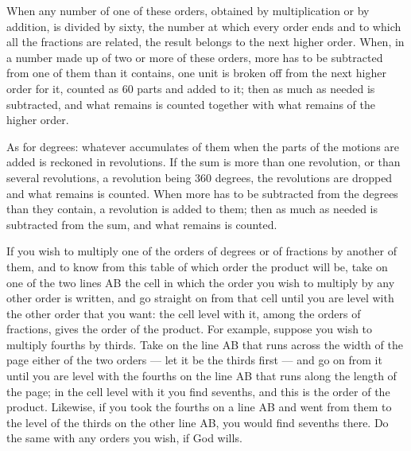 \documentclass[11pt]{article}
\newcommand{\ArPage}[1]{\marginpar{\footnotesize\color{gray}Ar.\,p.\,#1}}
\begin{document}
\par When any number of one of these orders, obtained by multiplication or by addition, is divided by sixty, the number at which every order ends and to which all the fractions are related, the result belongs to the next higher order. When, in a number made up of two or more of these orders, more has to be subtracted from one of them than it contains, one unit is broken off from the next higher order for it, counted as 60 parts and added to it; then as much as needed is subtracted, and what remains is counted together with what remains of the higher order.\par
\par As for degrees: whatever accumulates of them when the parts of the motions are added is reckoned in revolutions. If the sum is more than one revolution, or than several revolutions, a revolution being 360 degrees, the revolutions are dropped and what remains is counted. When more has to be subtracted from the degrees than they contain, a revolution is added to them; then as much as needed is subtracted from the sum, and what remains is counted.\par
\par \ArPage{10}If you wish to multiply one of the orders of degrees or of fractions by another of them, and to know from this table of which order the product will be, take on one of the two lines AB the cell in which the order you wish to multiply by any other order is written, and go straight on from that cell until you are level with the other order that you want: the cell level with it, among the orders of fractions, gives the order of the product. For example, suppose you wish to multiply fourths by thirds. Take on the line AB that runs across the width of the page either of the two orders — let it be the thirds first — and go on from it until you are level with the fourths on the line AB that runs along the length of the page; in the cell level with it you find sevenths, and this is the order of the product. Likewise, if you took the fourths on a line AB and went from them to the level of the thirds on the other line AB, you would find sevenths there. Do the same with any orders you wish, if God wills.\par
\end{document}
